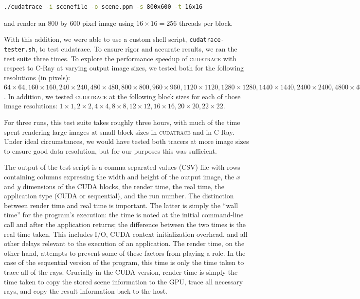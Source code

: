 \documentclass[12pt]{article}
\begin{document}
\begin{lstlisting}[language=bash]
    ./cudatrace -i scenefile -o scene.ppm -s 800x600 -t 16x16
\end{lstlisting}

and render an 800 by 600 pixel image using $16 \times 16 = 256$ threads per block.

With this addition, we were able to use a custom shell script, \texttt{cudatrace-tester.sh}, to test cudatrace. To ensure rigor and accurate results, we ran the test suite three times. To explore the performance speedup of \textsc{cudatrace} with respect to C-Ray at varying output image sizes, we tested both for the following resolutions (in pixels): $64 \times 64, 160\times160, 240\times240, 480\times480, 800\times800, 960\times960, 1120\times1120, 1280\times1280, 1440\times1440, 2400\times2400, 4800\times4800, 8000\times8000, 9600\times9600, 11200\times11200, 12800\times12800, 14400\times14400, and 16000\times16000$. In addition, we tested \textsc{cudatrace} at the following block sizes for each of those image resolutions: $1\times1, 2\times2, 4\times4, 8\times8, 12\times12, 16\times16, 20\times20, 22\times22$.

For three runs, this test suite takes roughly three hours, with much of the time spent rendering large images at small block sizes in \textsc{cudatrace} and in C-Ray. Under ideal circumstances, we would have tested both tracers at more image sizes to ensure good data resolution, but for our purposes this was sufficient.

The output of the test script is a comma-separated values (CSV) file with rows containing columns expressing the width and height of the output image, the $x$ and $y$ dimensions of the CUDA blocks, the render time, the real time, the application type (CUDA or sequential), and the run number. The distinction between render time and real time is important. The latter is simply the ``wall time'' for the program's execution: the time is noted at the initial command-line call and after the application returns; the difference between the two times is the real time taken. This includes I/O, CUDA context initialization overhead, and all other delays relevant to the execution of an application. The render time, on the other hand, attempts to prevent some of these factors from playing a role.  In the case of the sequential version of the program, this time is only the time taken to trace all of the rays. Crucially in the CUDA version, render time is simply the time taken to copy the stored scene information to the GPU, trace all necessary rays, and copy the result information back to the host.
\end{document}

